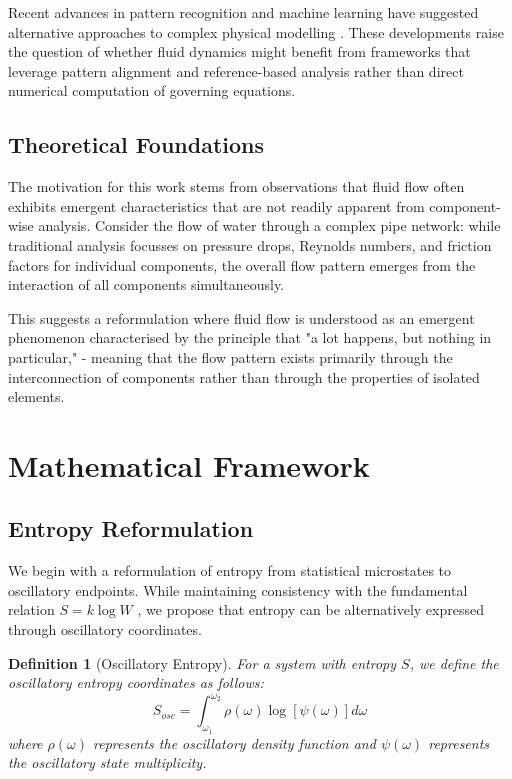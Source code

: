 \documentclass[12pt,a4paper]{article}
\newtheorem{definition}{Definition}
\begin{document}
Recent advances in pattern recognition and machine learning have suggested alternative approaches to complex physical modelling \cite{brunton2020machine}. These developments raise the question of whether fluid dynamics might benefit from frameworks that leverage pattern alignment and reference-based analysis rather than direct numerical computation of governing equations.

\subsection{Theoretical Foundations}

The motivation for this work stems from observations that fluid flow often exhibits emergent characteristics that are not readily apparent from component-wise analysis. Consider the flow of water through a complex pipe network: while traditional analysis focusses on pressure drops, Reynolds numbers, and friction factors for individual components, the overall flow pattern emerges from the interaction of all components simultaneously.

This suggests a reformulation where fluid flow is understood as an emergent phenomenon characterised by the principle that "a lot happens, but nothing in particular," - meaning that the flow pattern exists primarily through the interconnection of components rather than through the properties of isolated elements.

\section{Mathematical Framework}

\subsection{Entropy Reformulation}

We begin with a reformulation of entropy from statistical microstates to oscillatory endpoints. While maintaining consistency with the fundamental relation $S = k \log W$ \cite{boltzmann1877}, we propose that entropy can be alternatively expressed through oscillatory coordinates.

\begin{definition}[Oscillatory Entropy]
For a system with entropy $S$, we define the oscillatory entropy coordinates as follows:
\begin{equation}
S_{osc} = \int_{\omega_1}^{\omega_2} \rho(\omega) \log[\psi(\omega)] d\omega
\end{equation}
where $\rho(\omega)$ represents the oscillatory density function and $\psi(\omega)$ represents the oscillatory state multiplicity.
\end{definition}
\end{document}
